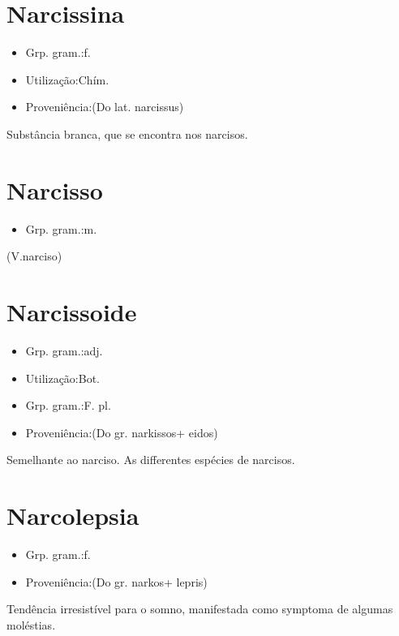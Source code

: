 \section{Narcissina}
\begin{itemize}
\item {Grp. gram.:f.}
\end{itemize}
\begin{itemize}
\item {Utilização:Chím.}
\end{itemize}
\begin{itemize}
\item {Proveniência:(Do lat. \textunderscore narcissus\textunderscore )}
\end{itemize}
Substância branca, que se encontra nos narcisos.
\section{Narcisso}
\begin{itemize}
\item {Grp. gram.:m.}
\end{itemize}
(V.narciso)
\section{Narcissoide}
\begin{itemize}
\item {Grp. gram.:adj.}
\end{itemize}
\begin{itemize}
\item {Utilização:Bot.}
\end{itemize}
\begin{itemize}
\item {Grp. gram.:F. pl.}
\end{itemize}
\begin{itemize}
\item {Proveniência:(Do gr. \textunderscore narkissos\textunderscore  + \textunderscore eidos\textunderscore )}
\end{itemize}
Semelhante ao narciso.
As differentes espécies de narcisos.
\section{Narcolepsia}
\begin{itemize}
\item {Grp. gram.:f.}
\end{itemize}
\begin{itemize}
\item {Proveniência:(Do gr. \textunderscore narkos\textunderscore  + \textunderscore lepris\textunderscore )}
\end{itemize}
Tendência irresistível para o somno, manifestada como symptoma de algumas moléstias.
